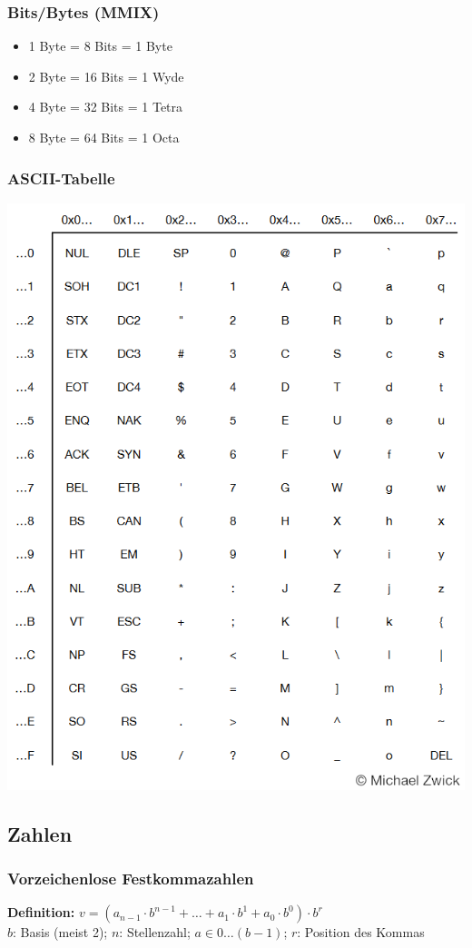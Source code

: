 \documentclass[german, threecolumn, 8pt]{latex4ei/latex4ei_sheet}
\begin{document}
	\subsubsection{Bits/Bytes (MMIX)}
	\begin{itemize}\itemsep0pt
	\item1 Byte = 8 Bits = 1 Byte
	\item2 Byte = 16 Bits = 1 Wyde
	\item4 Byte = 32 Bits = 1 Tetra
	\item8 Byte = 64 Bits = 1 Octa
	\end{itemize}
	\begin{sectionbox}
	\subsubsection{ASCII-Tabelle}
	\includegraphics[width=.85\linewidth]{./img/ascii_table.png}
	\end{sectionbox}
	\subsection{Zahlen}
	\subsubsection{Vorzeichenlose Festkommazahlen}
	\textbf{Definition:} $v=(a_{n-1} \cdot b^{n-1}+\dots+a_1 \cdot b^1 + a_0 \cdot b^0) \cdot b^r$\\
	$b$: Basis (meist 2); $n$: Stellenzahl; $a \in 0 \dots (b-1)$; $r$: Position des Kommas
\end{document}
